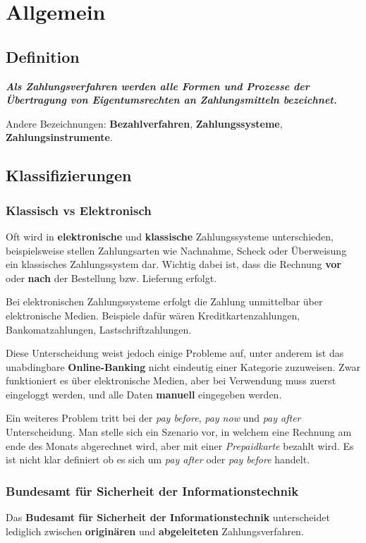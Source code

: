 
\section{Allgemein}
\subsection{Definition}
\textit{\textbf{Als Zahlungsverfahren werden alle Formen und Prozesse der Übertragung von Eigentumsrechten an Zahlungsmitteln bezeichnet.}}

Andere Bezeichnungen: \textbf{Bezahlverfahren}, \textbf{Zahlungssysteme}, \textbf{Zahlungsinstrumente}.

\subsection{Klassifizierungen}
\subsubsection{Klassisch vs Elektronisch}
Oft wird in \textbf{elektronische} und \textbf{klassische} Zahlungssysteme unterschieden, beispielsweise stellen Zahlungsarten wie Nachnahme, Scheck oder Überweisung ein klassisches Zahlungssystem dar. Wichtig dabei ist, dass die Rechnung \textbf{vor} oder \textbf{nach} der Bestellung bzw. Lieferung erfolgt. 

Bei elektronischen Zahlungssysteme erfolgt die Zahlung unmittelbar über elektronische Medien. Beispiele dafür wären Kreditkartenzahlungen, Bankomatzahlungen, Lastschriftzahlungen. 

Diese Unterscheidung weist jedoch einige Probleme auf, unter anderem ist das unabdingbare \textbf{Online-Banking} nicht eindeutig einer Kategorie zuzuweisen. Zwar funktioniert es über elektronische Medien, aber bei Verwendung muss zuerst eingeloggt werden, und alle Daten \textbf{manuell} eingegeben werden. 

Ein weiteres Problem tritt bei der \textit{pay before}, \textit{pay now} und \textit{pay after} Unterscheidung. Man stelle sich ein Szenario vor, in welchem eine Rechnung am ende des Monats abgerechnet wird, aber mit einer \textit{Prepaidkarte} bezahlt wird. Es ist nicht klar definiert ob es sich um \textit{pay after} oder \textit{pay before} handelt.

\subsubsection{Bundesamt für Sicherheit der Informationstechnik}
Das \textbf{Budesamt für Sicherheit der Informationstechnik} unterscheidet lediglich zwischen \textbf{originären} und \textbf{abgeleiteten} Zahlungsverfahren.

